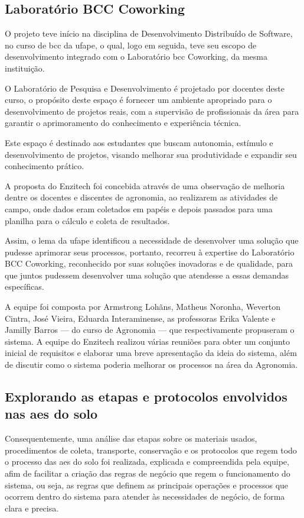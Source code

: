\subsection{Laboratório BCC Coworking}\label{sec:lab}
O projeto teve início na disciplina de Desenvolvimento Distribuído de Software, no curso de \ac{bcc} da \ac{ufape}, o qual, logo em seguida, teve seu escopo de desenvolvimento integrado com o Laboratório \ac{bcc} Coworking, da mesma instituição. 

O Laboratório de Pesquisa e Desenvolvimento é projetado por docentes deste curso, o propósito deste espaço é fornecer um ambiente apropriado para o desenvolvimento de projetos reais, com a supervisão de profissionais da área para garantir o aprimoramento do conhecimento e experiência técnica. 

Este espaço é destinado aos estudantes que buscam autonomia, estímulo e desenvolvimento de projetos, visando melhorar sua produtividade e expandir seu conhecimento prático.

A proposta do Enzitech foi concebida através de uma observação de melhoria dentre os docentes e discentes de agronomia, ao realizarem as atividades de campo, onde dados eram coletados em papéis e depois passados para uma planilha para o cálculo e coleta de resultados.

Assim, o \ac{lema} da \ac{ufape} identificou a necessidade de desenvolver uma solução que pudesse aprimorar seus processos, portanto, recorreu à expertise do Laboratório BCC Coworking, reconhecido por suas soluções inovadoras e de qualidade, para que juntos pudessem desenvolver uma solução que atendesse a essas demandas específicas. 

A equipe foi composta por Armstrong Lohãns, Matheus Noronha, Weverton Cintra, José Vieira, Eduarda Interaminense, as professoras Erika Valente e Jamilly Barros — do curso de Agronomia — que respectivamente propuseram o sistema. A equipe do Enzitech realizou várias reuniões para obter um conjunto inicial de requisitos e elaborar uma breve apresentação da ideia do sistema, além de discutir como o sistema poderia melhorar os processos na área da Agronomia.

\subsection{Explorando as etapas e protocolos envolvidos nas \acp{ae} do solo}
Consequentemente, uma análise das etapas sobre os materiais usados, procedimentos de coleta, transporte, conservação e os protocolos que regem todo o processo das \acp{ae} do solo foi realizada, explicada e compreendida pela equipe, afim de facilitar a criação das regras de negócio que regem o funcionamento do sistema, ou seja, as regras que definem as principais operações e processos que ocorrem dentro do sistema para atender às necessidades de negócio, de forma clara e precisa.

